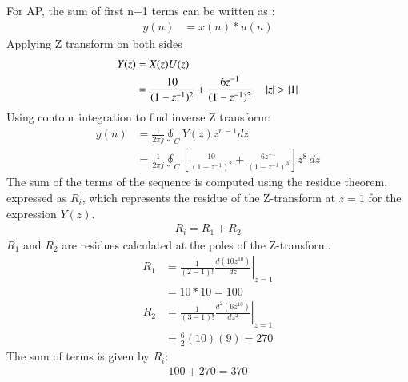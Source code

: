 \documentclass[journal,12pt,twocolumn]{IEEEtran}
\theoremstyle{remark}
\begin{document}
For AP, the sum of first n+1 terms can be written as :
\begin{align}
	 y(n)&=x(n)*u(n)
\end{align}  
Applying Z transform on both sides
\begin{align}
	Y(z) &= X(z)U(z)\\
	&=\frac{10}{(1-z^{-1})^2} + \frac{6z^{-1}}{(1-z^{-1})^3}
	\quad \left\vert z\right\vert>\left\vert1\right\vert
\end{align}
Using contour integration to find inverse Z transform:
\begin{align}
	y(n) &= \frac{1}{2\pi j} \oint_C Y(z) z^{n-1} dz\\
	&= \frac{1}{2\pi j} \oint_C \left[ \frac{10}{(1-z^{-1})^2} + \frac{6z^{-1}}{(1-z^{-1})^3} \right]z^{8} \, dz
\end{align}
The sum of the terms of the sequence is computed using the residue theorem, expressed as $R_i$, which represents the residue of the Z-transform at $ z=1 $ for the expression $ Y(z) $.
\begin{align}
	R_i=R_1 + R_2
\end{align}
 $R_1$ and $R_2$ are residues calculated at the poles of the Z-transform.
\begin{align}
		R_1 &= \frac{1}{{(2-1)!}} \left. \frac{d (10z^{10})}{dz} \right|_{z=1} \\
	&=10*10=100
\end{align}
\begin{align}
	R_2 &= \frac{1}{{(3-1)!}} \left. \frac{d^2(6z^{10})}{dz^2} \right|_{z=1} \\
	&= \frac{6}{2}(10)(9) = 270
\end{align}
The sum of terms is given by $R_i$:
 \begin{align}
100 + 270 = 370
\end{align}
\end{document}
